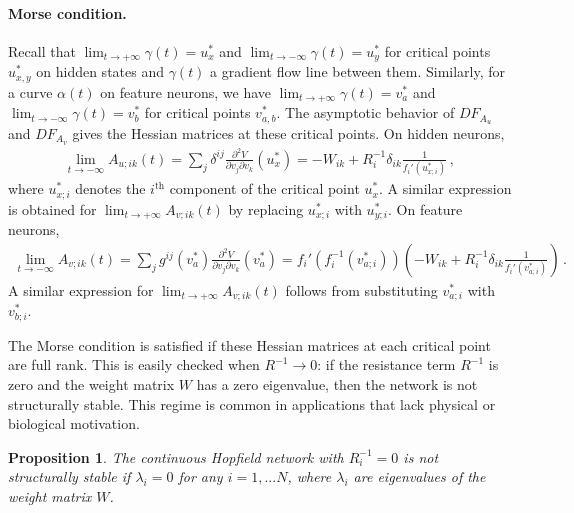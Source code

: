 \documentclass[12pt]{article}
\newtheorem{proposition}[theorem]{Proposition}
\begin{document}
\paragraph{Morse condition.}
Recall that $\lim_{t\rightarrow + \infty}\gamma(t) = u^{*}_x$ and $\lim_{t\rightarrow - \infty}\gamma(t) = u^{*}_y$ for critical points $u^{*}_{x,y}$ on hidden states and $\gamma(t)$ a gradient flow line between them. Similarly, for a curve $\alpha(t)$ on feature neurons, we have $\lim_{t\rightarrow + \infty}\gamma(t) = v^{*}_a$ and $\lim_{t\rightarrow - \infty}\gamma(t) = v^{*}_b$ for critical points $v^{*}_{a,b}$. The asymptotic behavior of $DF_{A_{u}}$ and $DF_{A_{v}}$ gives the Hessian matrices at these critical points. On hidden neurons,
\begin{align*}
\label{equation:hopfield-hessian-hidden-states}
    \lim_{t\rightarrow -\infty} A_{u;ik}(t) = \sum_{j} \delta^{ij} \frac{\partial^2 V}{\partial v_j \partial v_k} (u^*_x) = -W_{ik} + R^{-1}_{i } \delta_{ik} \frac{1}{f_i'(u^*_{x;i})} \, ,
\end{align*}
where $u^{*}_{x;i}$ denotes the $i^\text{th}$ component of the critical point $u^{*}_{x}$. A similar expression is obtained for $\lim_{t\rightarrow +\infty} A_{v;ik}(t)$ by replacing $u^{*}_{x;i}$ with $u^{*}_{y;i}$. On feature neurons,
\begin{align*}
    \lim_{t\rightarrow -\infty} A_{v;ik}(t) = \sum_{j} g^{ij}(v^*_a) \frac{\partial^2 V}{\partial v_j \partial v_k} (v^*_a) =f_i'\left(f_i^{-1}(v^*_{a;i}) \right)\left( - W_{ik} + R^{-1}_{i } \delta_{ik} \frac{1}{f_i'(v^*_{a;i})}\right) \, .
\end{align*}
A similar expression for $\lim_{t\rightarrow +\infty} A_{v;ik}(t)$ follows from substituting $v^{*}_{a;i}$ with $v^{*}_{b;i}$.

The Morse condition is satisfied if these Hessian matrices at each critical point are full rank. This is easily checked when $R^{-1} \rightarrow 0$: if the resistance term $R^{-1}$ is zero and the weight matrix $W$ has a zero eigenvalue, then the network is not structurally stable. This regime is common in applications that lack physical or biological motivation.

\begin{proposition}
\label{proposition:structural-stability-Hopfield-newtork}
    The continuous Hopfield network with $R_i^{-1} = 0$ is not structurally stable if $\lambda_i = 0$ for any $i=1,...N$, where $\lambda_i$ are eigenvalues of the weight matrix $W$.
\end{proposition}
\end{document}
